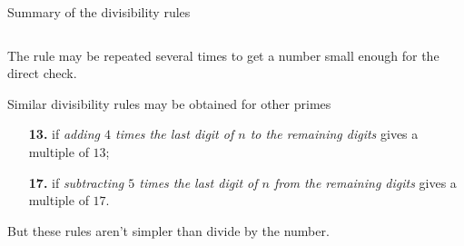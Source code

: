 \documentclass[9pt,aspectratio=169]{beamer}
\DeclareMathOperator{\lcm}{lcm}
\begin{document}
\begin{frame}{Summary of the divisibility rules}
\begin{columns}[T]
\begin{column}{0.5\textwidth}
{      The rule may be repeated several times to get a number small enough for the direct check.

      Similar divisibility rules may be obtained for other primes}

      \begin{enumerate}
        \item[\textbf{13.}] if \emph{adding $4$ times the last digit of $n$ to the remaining digits} gives a multiple of $13$;
        \item[\textbf{17.}] if \emph{subtracting $5$ times the last digit of $n$ from the remaining digits} gives a multiple of $17$.
      \end{enumerate}

      {\small But these rules aren't simpler than divide by the number.}
    \end{column}
  \end{columns}
\end{frame}

\end{document}

